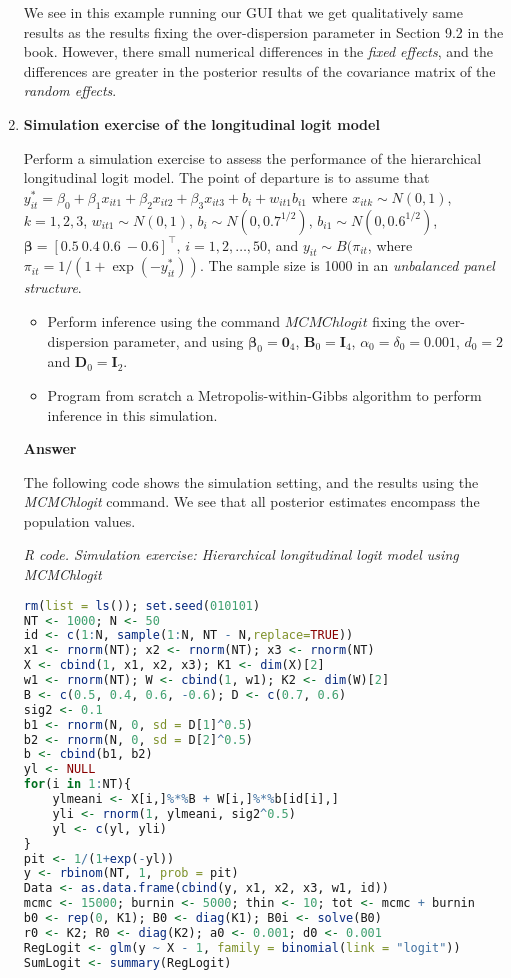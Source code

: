 \begin{enumerate}[leftmargin=*]
We see in this example running our GUI that we get qualitatively same results as the results fixing the over-dispersion parameter in Section 9.2 in the book. However, there small numerical differences in the \textit{fixed effects}, and the differences are greater in the posterior results of the covariance matrix of the \textit{random effects}.

\item \textbf{Simulation exercise of the longitudinal logit model}

Perform a simulation exercise to assess the performance of the hierarchical longitudinal logit model. The point of departure is to assume that $y_{it}^*=\beta_0+\beta_1x_{it1}+\beta_2x_{it2}+\beta_3x_{it3}+b_i+w_{it1}b_{i1}$ where $x_{itk}\sim N(0,1)$, $k=1,2,3$, $w_{it1}\sim N(0,1)$, $b_i\sim N(0, 0.7^{1/2})$, $b_{i1}\sim N(0, 0.6^{1/2})$, $\bm{\beta}=[0.5 \ 0.4 \ 0.6 \ -0.6]^{\top}$, $i=1,2,\dots,50$, and $y_{it}\sim B(\pi_{it}$, where $\pi_{it}=1/(1+\exp(-y_{it}^*))$. The sample size is 1000 in an \textit{unbalanced panel structure}.

\begin{itemize}
	\item Perform inference using the command $MCMChlogit$ fixing the over-dispersion parameter, and using $\bm{\beta}_0=\bm{0}_4$, $\bm{B}_0=\bm{I}_4$, $\alpha_0=\delta_0=0.001$, $d_0=2$ and $\bm{D}_0=\bm{I}_2$.
	\item Program from scratch a Metropolis-within-Gibbs algorithm to perform inference in this simulation.  
\end{itemize}

\textbf{Answer}

The following code shows the simulation setting, and the results using the \textit{MCMChlogit} command. We see that all posterior estimates encompass the population values.

\begin{tcolorbox}[enhanced,width=4.67in,center upper,
	fontupper=\large\bfseries,drop shadow southwest,sharp corners]
	\textit{R code. Simulation exercise: Hierarchical longitudinal logit model using MCMChlogit}
	\begin{VF}
		\begin{lstlisting}[language=R]
rm(list = ls()); set.seed(010101)
NT <- 1000; N <- 50
id <- c(1:N, sample(1:N, NT - N,replace=TRUE))
x1 <- rnorm(NT); x2 <- rnorm(NT); x3 <- rnorm(NT) 
X <- cbind(1, x1, x2, x3); K1 <- dim(X)[2]
w1 <- rnorm(NT); W <- cbind(1, w1); K2 <- dim(W)[2]
B <- c(0.5, 0.4, 0.6, -0.6); D <- c(0.7, 0.6)
sig2 <- 0.1
b1 <- rnorm(N, 0, sd = D[1]^0.5)
b2 <- rnorm(N, 0, sd = D[2]^0.5)
b <- cbind(b1, b2)
yl <- NULL
for(i in 1:NT){
	ylmeani <- X[i,]%*%B + W[i,]%*%b[id[i],]
	yli <- rnorm(1, ylmeani, sig2^0.5)
	yl <- c(yl, yli)
}
pit <- 1/(1+exp(-yl))
y <- rbinom(NT, 1, prob = pit)
Data <- as.data.frame(cbind(y, x1, x2, x3, w1, id))
mcmc <- 15000; burnin <- 5000; thin <- 10; tot <- mcmc + burnin
b0 <- rep(0, K1); B0 <- diag(K1); B0i <- solve(B0) 
r0 <- K2; R0 <- diag(K2); a0 <- 0.001; d0 <- 0.001
RegLogit <- glm(y ~ X - 1, family = binomial(link = "logit"))
SumLogit <- summary(RegLogit)


\end{lstlisting}
\end{VF}
\end{tcolorbox}
\end{enumerate}
